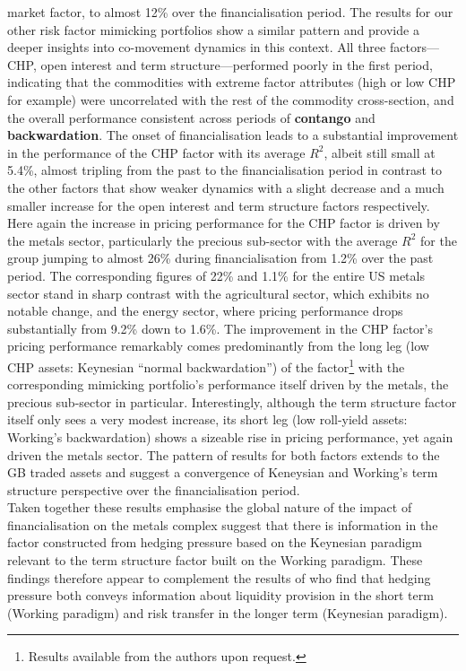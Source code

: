 \documentclass[
  authoryear,
  preprint,
  3p]{elsarticle}
\begin{document}
market factor, to almost 12\% over the financialisation period. The
results for our other risk factor mimicking portfolios show a similar
pattern and provide a deeper insights into co-movement dynamics in this
context. All three factors---CHP, open interest and term
structure---performed poorly in the first period, indicating that the
commodities with extreme factor attributes (high or low CHP for example)
were uncorrelated with the rest of the commodity cross-section, and the
overall performance consistent across periods of \textbf{contango} and
\textbf{backwardation}. The onset of financialisation leads to a
substantial improvement in the performance of the CHP factor with its
average \(R^{2}\), albeit still small at 5.4\%, almost tripling from the
past to the financialisation period in contrast to the other factors
that show weaker dynamics with a slight decrease and a much smaller
increase for the open interest and term structure factors respectively.
Here again the increase in pricing performance for the CHP factor is
driven by the metals sector, particularly the precious sub-sector with
the average \(R^{2}\) for the group jumping to almost 26\% during
financialisation from 1.2\% over the past period. The corresponding
figures of 22\% and 1.1\% for the entire US metals sector stand in sharp
contrast with the agricultural sector, which exhibits no notable change,
and the energy sector, where pricing performance drops substantially
from 9.2\% down to 1.6\%. The improvement in the CHP factor's pricing
performance remarkably comes predominantly from the long leg (low CHP
assets: Keynesian ``normal backwardation'') of the factor\footnote{Results
  available from the authors upon request.} with the corresponding
mimicking portfolio's performance itself driven by the metals, the
precious sub-sector in particular. Interestingly, although the term
structure factor itself only sees a very modest increase, its short leg
(low roll-yield assets: Working's backwardation) shows a sizeable rise
in pricing performance, yet again driven the metals sector. The pattern
of results for both factors extends to the GB traded assets and suggest
a convergence of Keneysian and Working's term structure perspective over
the financialisation period.\\
Taken together these results emphasise the global nature of the impact
of financialisation on the metals complex suggest that there is
information in the factor constructed from hedging pressure based on the
Keynesian paradigm relevant to the term structure factor built on the
Working paradigm. These findings therefore appear to complement the
results of \citet{kang_tale_2020} who find that hedging pressure both
conveys information about liquidity provision in the short term (Working
paradigm) and risk transfer in the longer term (Keynesian paradigm).
\end{document}
